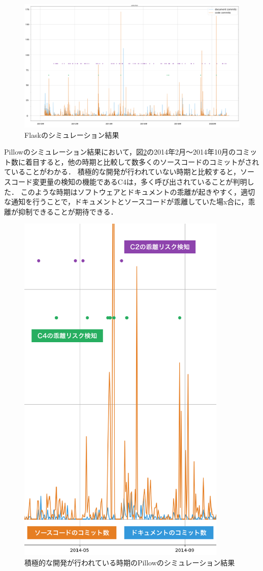 \begin{figure}[H]
    \centering
    \includegraphics[width=14cm]{images/sim3.png}
    \caption{Flaskのシミュレーション結果}
    \label{sim3}
\end{figure}

Pillowのシミュレーション結果において，図\ref{simpillow}の2014年2月〜2014年10月のコミット数に着目すると，他の時期と比較して数多くのソースコードのコミットがされていることがわかる．
積極的な開発が行われていない時期と比較すると，ソースコード変更量の検知の機能であるC4は，多く呼び出されていることが判明した．
このような時期はソフトウェアとドキュメントの乖離が起きやすく，適切な通知を行うことで，ドキュメントとソースコードが乖離していた場x合に，乖離が抑制できることが期待できる．
\begin{figure}[H]
    \centering
    \includegraphics[width=10cm]{images/pillow.png}
    \caption{積極的な開発が行われている時期のPillowのシミュレーション結果}
    \label{simpillow}
\end{figure}

